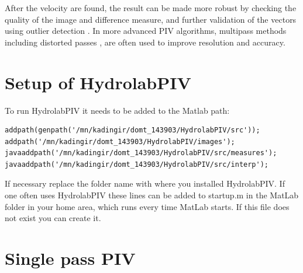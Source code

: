 \documentclass[10pt]{article}
\begin{document}
After the velocity are found, the result can be made more robust by 
checking the quality of the image and difference measure, and 
further validation of the vectors using outlier detection \citep{Westerweel1993,Westerweel2005}.
In more advanced PIV algorithms, multipass methods including distorted passes \citep{Huang1993a,Huang1993b,Scarano2002}, are often used to improve resolution and accuracy.
  \nocite{Kolaas2014}
  
  
  \section{Setup of HydrolabPIV}
  To run HydrolabPIV it needs to be added to the Matlab path:  
  \begin{lstlisting}
addpath(genpath('/mn/kadingir/domt_143903/HydrolabPIV/src'));
addpath('/mn/kadingir/domt_143903/HydrolabPIV/images');
javaaddpath('/mn/kadingir/domt_143903/HydrolabPIV/src/measures');
javaaddpath('/mn/kadingir/domt_143903/HydrolabPIV/src/interp');
  \end{lstlisting}
If necessary replace the folder name with where you installed HydrolabPIV.
%  
If one often uses HydrolabPIV these lines  
can be added to startup.m in the MatLab folder in your home area,
which runs every time MatLab starts.
If this file does not exist you can create it.
  
  \section{Single pass PIV}
  
  
  
\end{document}
